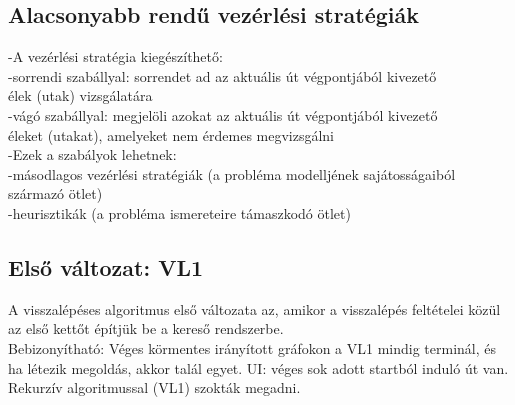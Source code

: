 \documentclass{article}
\begin{document}
	 \subsection{Alacsonyabb rendű vezérlési stratégiák}
	 -A vezérlési stratégia kiegészíthető:\\
	 \hspace*{1em} -sorrendi szabállyal: sorrendet ad az aktuális út végpontjából kivezető \\
	 \hspace*{2em} élek (utak) vizsgálatára\\
	 \hspace*{1em} -vágó szabállyal: megjelöli azokat az aktuális út végpontjából kivezető \\
	 \hspace*{2em} éleket (utakat), amelyeket nem érdemes megvizsgálni\\
	 -Ezek a szabályok lehetnek:\\
	 \hspace*{1em} -másodlagos vezérlési stratégiák (a probléma modelljének sajátosságaiból \\
	 \hspace*{2em} származó ötlet)\\
	 \hspace*{1em} -heurisztikák (a probléma ismereteire támaszkodó ötlet)\\
	 
	 \subsection{Első változat: VL1}
	 A visszalépéses algoritmus első változata az, amikor a visszalépés feltételei közül az első kettőt építjük be a kereső rendszerbe.\\
	 Bebizonyítható: Véges körmentes irányított gráfokon a VL1 mindig terminál, és ha létezik megoldás, akkor talál egyet. UI: véges sok adott startból induló út van.\\
	 Rekurzív algoritmussal (VL1) szokták megadni.
	 
\end{document}
